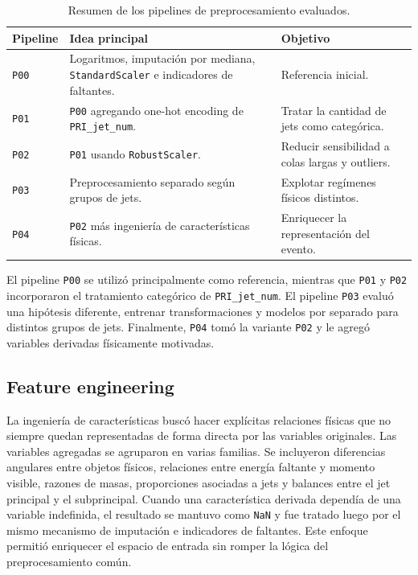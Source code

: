 \documentclass{article}
\begin{document}
\begin{table}[H]
    \centering
    \small
    \begin{tabular}{@{}p{} p{} p{}@{}}
        \toprule
        Pipeline & Idea principal & Objetivo \\
        \midrule
        \texttt{P00} & Logaritmos, imputación por mediana, \texttt{StandardScaler} e indicadores de faltantes. & Referencia inicial. \\
        \texttt{P01} & \texttt{P00} agregando one-hot encoding de \texttt{PRI\_jet\_num}. & Tratar la cantidad de jets como categórica. \\
        \texttt{P02} & \texttt{P01} usando \texttt{RobustScaler}. & Reducir sensibilidad a colas largas y outliers. \\
        \texttt{P03} & Preprocesamiento separado según grupos de jets. & Explotar regímenes físicos distintos. \\
        \texttt{P04} & \texttt{P02} más ingeniería de características físicas. & Enriquecer la representación del evento. \\
        \bottomrule
    \end{tabular}
    \caption{Resumen de los pipelines de preprocesamiento evaluados.}
    \label{tab:pipelines-preprocesamiento}
\end{table}

El pipeline \texttt{P00} se utilizó principalmente como referencia, mientras que \texttt{P01} y \texttt{P02} incorporaron el tratamiento categórico de \texttt{PRI\_jet\_num}. El pipeline \texttt{P03} evaluó una hipótesis diferente, entrenar transformaciones y modelos por separado para distintos grupos de jets. Finalmente, \texttt{P04} tomó la variante \texttt{P02} y le agregó variables derivadas físicamente motivadas.

\subsection{Feature engineering}
La ingeniería de características buscó hacer explícitas relaciones físicas que no siempre quedan representadas de forma directa por las variables originales. Las variables agregadas se agruparon en varias familias. Se incluyeron diferencias angulares entre objetos físicos, relaciones entre energía faltante y momento visible, razones de masas, proporciones asociadas a jets y balances entre el jet principal y el subprincipal. Cuando una característica derivada dependía de una variable indefinida, el resultado se mantuvo como \texttt{NaN} y fue tratado luego por el mismo mecanismo de imputación e indicadores de faltantes. Este enfoque permitió enriquecer el espacio de entrada sin romper la lógica del preprocesamiento común.
\end{document}
